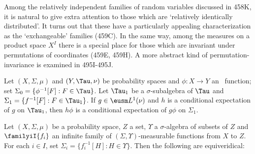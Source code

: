 
\def\chaptername{Perfect measures, disintegrations and processes}
\def\sectionname{Symmetric measures and exchangeable random variables}


Among the relatively independent families of random variables discussed
in 458K,
it is natural to give extra attention to those which are `relatively
identically distributed'.   It turns out that these have a particularly
appealing characterization as the `exchangeable' families (459C).   In
the same way, among the measures on a product space $X^I$ there is a
special place for those which are invariant under permutations of
coordinates (459E, 459H).   A more abstract kind of permutation-invariance
is examined in 495I-495J.

 Let $(X,\Sigma,\mu)$ and $(Y,\Tau,\nu)$ be
probability spaces and $\phi:X\to Y$ an \imp\ function;  set
$\Sigma_0=\{\phi^{-1}[F]:F\in\Tau\}$.   Let $\Tau_1$ be a
$\sigma$-subalgebra of $\Tau$ and
$\Sigma_1=\{f^{-1}[F]:F\in\Tau_1\}$.   If $g\in\eusm L^1(\nu)$ and $h$
is a conditional expectation of $g$ on $\Tau_1$, then $h\phi$ is a
conditional expectation of $g\phi$ on $\Sigma_1$.


 Let $(X,\Sigma,\mu)$ be
a probability space, $Z$ a set, $\Upsilon$ a $\sigma$-algebra of subsets
of $Z$ and $\familyiI{f_i}$ an infinite family of
$(\Sigma,\Upsilon)$-measurable functions from $X$ to $Z$.   For each
$i\in I$, set $\Sigma_i=\{f_i^{-1}[H]:H\in\Upsilon\}$.
Then the following are equiveridical:


